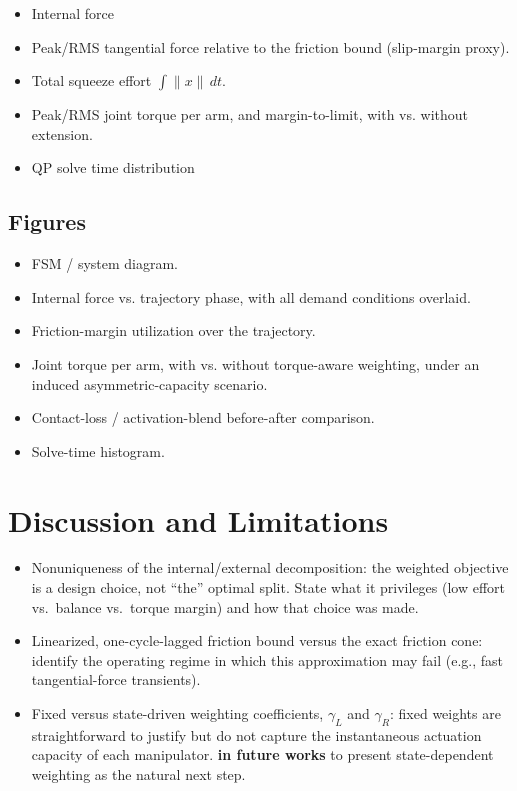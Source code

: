 \documentclass[conference]{IEEEtran}
\begin{document}
\begin{itemize}
    \item Internal force

    \item Peak/RMS tangential force relative to the friction bound (slip-margin proxy).

    \item Total squeeze effort \(\int \lVert x\rVert\,dt\).

    \item Peak/RMS joint torque per arm, and margin-to-limit, with vs. without extension.

    \item QP solve time distribution
\end{itemize}

\subsection*{Figures}

\begin{itemize}
    \item FSM / system diagram.
    \item Internal force vs. trajectory phase, with all demand conditions overlaid.
    \item Friction-margin utilization over the trajectory.
    \item Joint torque per arm, with vs. without torque-aware weighting, under an induced asymmetric-capacity scenario.
    \item Contact-loss / activation-blend before-after comparison.
    \item Solve-time histogram.
\end{itemize}

\section*{Discussion and Limitations}
\begin{itemize}
    \item Nonuniqueness of the internal/external decomposition: the weighted objective is a design choice, not ``the'' optimal split. State what it privileges (low effort vs.\ balance vs.\ torque margin) and how that choice was made.

    \item Linearized, one-cycle-lagged friction bound versus the exact friction cone: identify the operating regime in which this approximation may fail (e.g., fast tangential-force transients).

    \item Fixed versus state-driven weighting coefficients, \(\gamma_L\) and \(\gamma_R\): fixed weights are straightforward to justify but do not capture the instantaneous actuation capacity of each manipulator. \textbf{in future works} to present state-dependent weighting as the natural next step.
\end{itemize}
\end{document}
